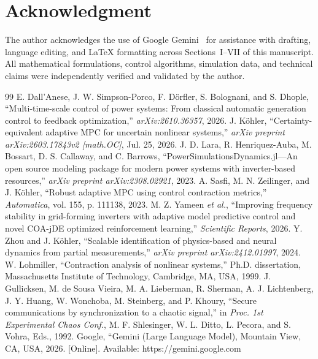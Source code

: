 \documentclass[journal]{IEEEtran}
\begin{document}
\section*{Acknowledgment}
The author acknowledges the use of Google Gemini~\cite{gemini26} for assistance with drafting, language editing, and LaTeX formatting across Sections~I--VII of this manuscript. All mathematical formulations, control algorithms, simulation data, and technical claims were independently verified and validated by the author.

\begin{thebibliography}{99}
 E. Dall'Anese, J. W. Simpson-Porco, F. D\"orfler, S. Bolognani, and S. Dhople, ``Multi-time-scale control of power systems: From classical automatic generation control to feedback optimization,'' \textit{arXiv:2610.36357}, 2026.
 J. K\"ohler, ``Certainty-equivalent adaptive MPC for uncertain nonlinear systems,'' \textit{arXiv preprint arXiv:2603.17843v2 [math.OC]}, Jul. 25, 2026.
 J. D. Lara, R. Henriquez-Auba, M. Bossart, D. S. Callaway, and C. Barrows, ``PowerSimulationsDynamics.jl---An open source modeling package for modern power systems with inverter-based resources,'' \textit{arXiv preprint arXiv:2308.02921}, 2023.
 A. Sasfi, M. N. Zeilinger, and J. K\"ohler, ``Robust adaptive MPC using control contraction metrics,'' \textit{Automatica}, vol. 155, p. 111138, 2023.
 M. Z. Yameen \textit{et al.}, ``Improving frequency stability in grid-forming inverters with adaptive model predictive control and novel COA-jDE optimized reinforcement learning,'' \textit{Scientific Reports}, 2026.
 Y. Zhou and J. K\"ohler, ``Scalable identification of physics-based and neural dynamics from partial measurements,'' \textit{arXiv preprint arXiv:2412.01997}, 2024.
 W. Lohmiller, ``Contraction analysis of nonlinear systems,'' Ph.D. dissertation, Massachusetts Institute of Technology, Cambridge, MA, USA, 1999.
 J. Gullicksen, M. de Sousa Vieira, M. A. Lieberman, R. Sherman, A. J. Lichtenberg, J. Y. Huang, W. Wonchoba, M. Steinberg, and P. Khoury, ``Secure communications by synchronization to a chaotic signal,'' in \textit{Proc. 1st Experimental Chaos Conf.}, M. F. Shlesinger, W. L. Ditto, L. Pecora, and S. Vohra, Eds., 1992.
 Google, ``Gemini (Large Language Model), Mountain View, CA, USA, 2026. [Online]. Available: https://gemini.google.com
\end{thebibliography}
\end{document}
